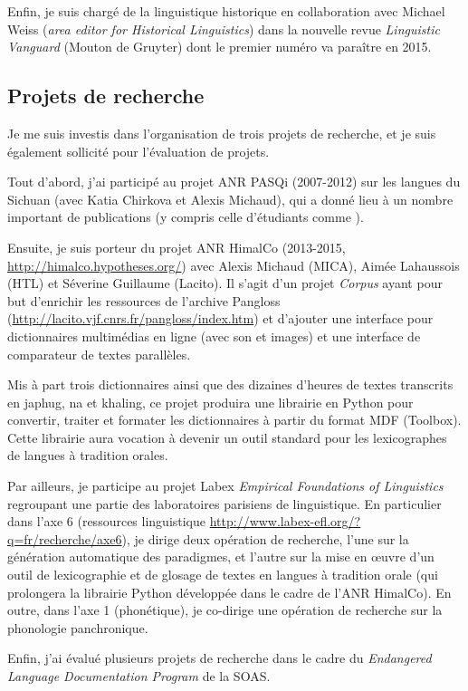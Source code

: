 \documentclass[oldfontcommands,oneside,a4paper,11pt]{article}
\begin{document}
Enfin, je suis chargé de la linguistique historique en collaboration avec Michael Weiss (\textit{area editor for Historical Linguistics}) dans la nouvelle revue \textit{Linguistic Vanguard} (Mouton de Gruyter) dont le premier numéro va paraître en 2015.


\subsection{Projets de recherche} \label{sec:projets}
Je me suis investis dans l'organisation de trois projets de recherche, et je suis également sollicité pour l'évaluation de projets.

Tout d'abord, j'ai participé au projet ANR PASQi (2007-2012) sur les langues du Sichuan (avec Katia Chirkova et Alexis Michaud), qui a donné lieu à un nombre important de publications (y compris celle d'étudiants comme \citealt{gongxun14agreement}).

Ensuite, je suis porteur du projet ANR HimalCo (2013-2015, \url{http://himalco.hypotheses.org/}) avec Alexis Michaud (MICA), Aimée Lahaussois (HTL) et Séverine Guillaume (Lacito). Il s'agit d'un projet \textit{Corpus} ayant pour but  d'enrichir les ressources de l'archive Pangloss (\url{http://lacito.vjf.cnrs.fr/pangloss/index.htm}) et d'ajouter une interface pour dictionnaires multimédias en ligne (avec son et images) et une interface de comparateur de textes parallèles.

Mis à part trois dictionnaires ainsi que des dizaines d'heures de textes transcrits en japhug, na et khaling, ce projet produira une librairie en Python pour convertir, traiter et formater les dictionnaires à partir du format MDF (Toolbox). Cette librairie aura vocation à devenir un outil standard pour les lexicographes de langues à tradition orales.

Par ailleurs, je participe au projet Labex \textit{Empirical Foundations of Linguistics} regroupant une partie des laboratoires parisiens de linguistique. En particulier dans l'axe 6 (ressources linguistique \url{http://www.labex-efl.org/?q=fr/recherche/axe6}),  je dirige deux opération de recherche, l'une sur la génération automatique des paradigmes, et l'autre sur la mise en œuvre d'un outil de lexicographie et de glosage de textes en langues à tradition orale (qui prolongera la librairie Python développée dans le cadre de l'ANR HimalCo).  En outre, dans l'axe 1 (phonétique),  je co-dirige une opération de recherche sur la phonologie panchronique.


Enfin, j'ai évalué  plusieurs projets de recherche dans le cadre du \textit{Endangered Language Documentation Program} de la SOAS.



 
\end{document}
